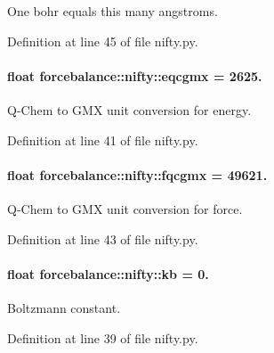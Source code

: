 \-One bohr equals this many angstroms. 



\-Definition at line 45 of file nifty.\-py.

\hypertarget{namespaceforcebalance_1_1nifty_a2b5a159b5e297e92699a10b05fa8911f}{
\paragraph[{eqcgmx}]{\setlength{\rightskip}{0pt plus 5cm}float {\bf forcebalance\-::nifty\-::eqcgmx} = 2625.}}\label{namespaceforcebalance_1_1nifty_a2b5a159b5e297e92699a10b05fa8911f}


\-Q-\/\-Chem to \-G\-M\-X unit conversion for energy. 



\-Definition at line 41 of file nifty.\-py.

\hypertarget{namespaceforcebalance_1_1nifty_a7ad933fe53e048142852569b9a288f2e}{
\paragraph[{fqcgmx}]{\setlength{\rightskip}{0pt plus 5cm}float {\bf forcebalance\-::nifty\-::fqcgmx} = 49621.}}\label{namespaceforcebalance_1_1nifty_a7ad933fe53e048142852569b9a288f2e}


\-Q-\/\-Chem to \-G\-M\-X unit conversion for force. 



\-Definition at line 43 of file nifty.\-py.

\hypertarget{namespaceforcebalance_1_1nifty_aace36d3e1ed8cd2ead67d53ec177063f}{
\paragraph[{kb}]{\setlength{\rightskip}{0pt plus 5cm}float {\bf forcebalance\-::nifty\-::kb} = 0.}}\label{namespaceforcebalance_1_1nifty_aace36d3e1ed8cd2ead67d53ec177063f}


\-Boltzmann constant. 



\-Definition at line 39 of file nifty.\-py.

